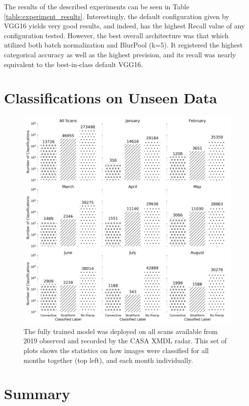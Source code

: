 The results of the described experiments can be seen in Table \ref{table:experiment_results}.
Interestingly, the default configuration given by VGG16 yields very good results, and indeed, has the highest Recall value of any configuration tested.
However, the best overall architecture was that which utilized both batch normalization and BlurPool (k=5).
It registered the highest categorical accuracy as well as the highest precision, and its recall was nearly equivalent to the best-in-class default VGG16.

\section{Classifications on Unseen Data}
\label{sec:bestmodel_newdata}

\begin{figure}[ht]
	\centering
	\includegraphics[width=\textwidth]{./thesis_code/plots/2019_predictions_hist_bw.png}
	\caption{The fully trained model was deployed on all scans available from 2019 observed and recorded by the CASA XMDL radar. This set of plots shows the statistics on how images were classified for all months together (top left), and each month individually.}
	\label{fig:bestmodel_all_hists}
\end{figure}

\section{Summary}
\label{sec:bestmodel_summary}

